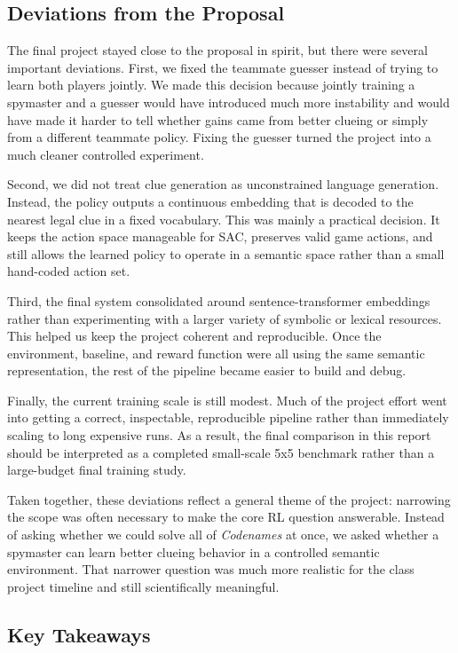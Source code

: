 \documentclass[9pt]{article}
\begin{document}
\subsection{Deviations from the
Proposal}\label{deviations-from-the-proposal}

The final project stayed close to the proposal in spirit, but there were
several important deviations. First, we fixed the teammate guesser
instead of trying to learn both players jointly. We made this decision
because jointly training a spymaster and a guesser would have introduced
much more instability and would have made it harder to tell whether
gains came from better clueing or simply from a different teammate
policy. Fixing the guesser turned the project into a much cleaner
controlled experiment.

Second, we did not treat clue generation as unconstrained language
generation. Instead, the policy outputs a continuous embedding that is
decoded to the nearest legal clue in a fixed vocabulary. This was mainly
a practical decision. It keeps the action space manageable for SAC,
preserves valid game actions, and still allows the learned policy to
operate in a semantic space rather than a small hand-coded action set.

Third, the final system consolidated around sentence-transformer
embeddings rather than experimenting with a larger variety of symbolic
or lexical resources. This helped us keep the project coherent and
reproducible. Once the environment, baseline, and reward function were
all using the same semantic representation, the rest of the pipeline
became easier to build and debug.

Finally, the current training scale is still modest. Much of the project
effort went into getting a correct, inspectable, reproducible pipeline
rather than immediately scaling to long expensive runs. As a result, the
final comparison in this report should be interpreted as a completed
small-scale 5x5 benchmark rather than a large-budget final training
study.

Taken together, these deviations reflect a general theme of the project:
narrowing the scope was often necessary to make the core RL question
answerable. Instead of asking whether we could solve all of
\emph{Codenames} at once, we asked whether a spymaster can learn better
clueing behavior in a controlled semantic environment. That narrower
question was much more realistic for the class project timeline and
still scientifically meaningful.

\subsection{Key Takeaways}\label{what-we-learned}
\end{document}
